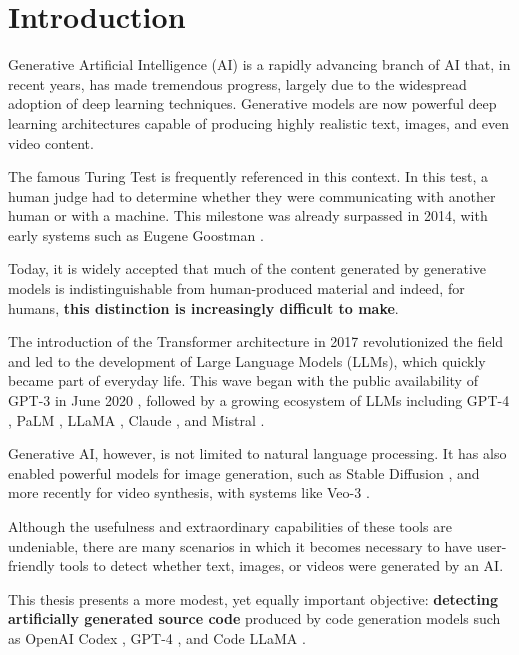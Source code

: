 \clearpage
\chapter{Introduction}


Generative Artificial Intelligence (AI) is a rapidly advancing 
branch of AI that, in recent years, has made 
tremendous progress, largely due to the widespread adoption of 
deep learning techniques. Generative models 
are now powerful deep learning architectures capable of producing 
highly realistic text, images, and even video content.


The famous Turing Test is frequently referenced in this context. 
In this test, a human judge had to determine whether they were 
communicating with another human or with a machine. This milestone 
was already surpassed in 2014, with early systems such as Eugene Goostman 
\cite{warwick2016turing}.


Today, it is widely accepted that much of the content generated by 
generative models is indistinguishable from human-produced material
and indeed, for humans, \textbf{this distinction is increasingly difficult 
to make}.


The introduction of the Transformer architecture in 2017 
\cite{vaswani2017attention} revolutionized the field 
and led to the development of Large Language Models (LLMs), 
which quickly became part of everyday life. This wave began 
with the public availability of GPT-3 in June 2020 
\cite{brown2020language}, followed by a growing ecosystem of 
LLMs including GPT-4 \cite{openai2023gpt4}, PaLM 
\cite{chowdhery2022palm}, LLaMA \cite{touvron2023llama}, 
Claude \cite{anthropic2023claude}, and Mistral \cite{jiang2023mistral}.

Generative AI, however, is not limited to natural language 
processing. It has also enabled powerful models for image 
generation, such as Stable Diffusion \cite{rombach2022high}, 
and more recently for video 
synthesis, with systems like Veo-3 \cite{google2024veo}.


Although the usefulness and extraordinary capabilities of these 
tools are undeniable, there are many scenarios in which it becomes 
necessary to have user-friendly tools to detect whether text, images, 
or videos were generated by an AI.

This thesis presents a more modest, yet equally important objective: 
\textbf{detecting artificially generated source code} produced by code generation 
models such as OpenAI Codex \cite{chen2021codex}, GPT-4 \cite{openai2023gpt4}, 
and Code LLaMA \cite{roziere2023code}.


